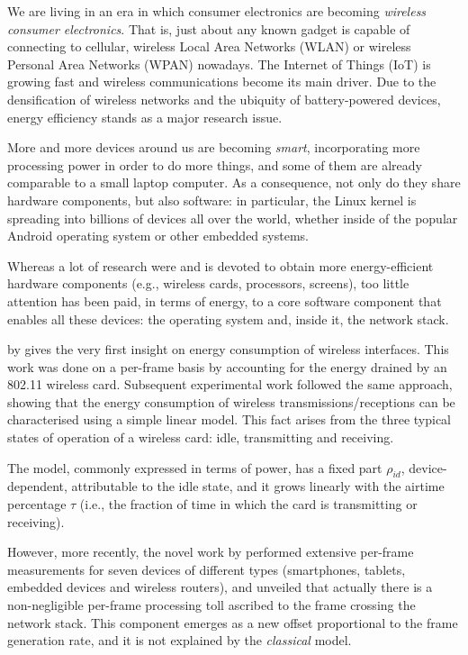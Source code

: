 \documentclass[twoside,nohyper]{tufte-book}
\begin{document}
We are living in an era in which consumer electronics are becoming \emph{wireless consumer electronics}. That is, just about any known gadget is capable of connecting to cellular, wireless Local Area Networks (WLAN) or wireless Personal Area Networks (WPAN) nowadays. The Internet of Things (IoT) is growing fast and wireless communications become its main driver. Due to the densification of wireless networks and the ubiquity of battery-powered devices, energy efficiency stands as a major research issue.

More and more devices around us are becoming \emph{smart}, incorporating more processing power in order to do more things, and some of them are already comparable to a small laptop computer. As a consequence, not only do they share hardware components, but also software: in particular, the Linux kernel is spreading into billions of devices all over the world, whether inside of the popular Android operating system or other embedded systems.

Whereas a lot of research were and is devoted to obtain more energy-efficient hardware components (e.g., wireless cards, processors, screens), too little attention has been paid, in terms of energy, to a core software component that enables all these devices: the operating system and, inside it, the network stack.

 by \citet{Feeney2001}\cite{Feeney2001} gives the very first insight on energy consumption of wireless interfaces. This work was done on a per-frame basis by accounting for the energy drained by an 802.11 wireless card. Subsequent experimental work followed the same approach, showing that the energy consumption of wireless transmissions/receptions can be characterised using a simple linear model. This fact arises from the three typical states of operation of a wireless card: idle, transmitting and receiving.

The model, commonly expressed in terms of power, has a fixed part \(\rho_{id}\), device-dependent, attributable to the idle state, and it grows linearly with the airtime percentage \(\tau\) (i.e., the fraction of time in which the card is transmitting or receiving).

However, more recently, the novel work by \citet{Serrano2014}\cite{Serrano2014} performed extensive per-frame measurements for seven devices of different types (smartphones, tablets, embedded devices and wireless routers), and unveiled that actually there is a non-negligible per-frame processing toll ascribed to the frame crossing the network stack. This component emerges as a new offset proportional to the frame generation rate, and it is not explained by the \emph{classical} model.
\end{document}
